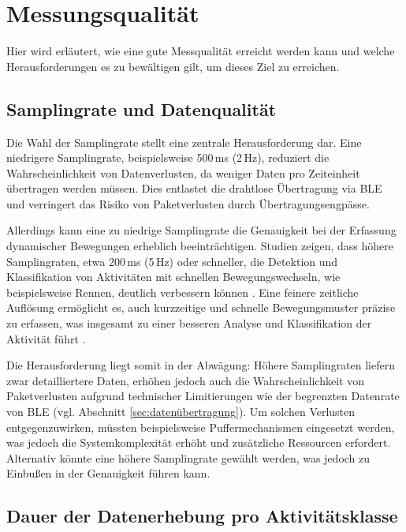 \section{Messungsqualität}
\label{sec:messungsqualität}

Hier wird erläutert, wie eine gute Messqualität erreicht werden kann und welche Herausforderungen es zu bewältigen gilt, um dieses Ziel zu erreichen.

\subsection{Samplingrate und Datenqualität}

Die Wahl der Samplingrate stellt eine zentrale Herausforderung dar. Eine niedrigere Samplingrate, beispielsweise 500\,ms (2\,Hz), reduziert die Wahrscheinlichkeit von Datenverlusten, da weniger Daten pro Zeiteinheit übertragen werden müssen. Dies entlastet die drahtlose Übertragung via BLE und verringert das Risiko von Paketverlusten durch Übertragungsengpässe.

Allerdings kann eine zu niedrige Samplingrate die Genauigkeit bei der Erfassung dynamischer Bewegungen erheblich beeinträchtigen. Studien zeigen, dass höhere Samplingraten, etwa 200 ms (5 Hz) oder schneller, die Detektion und Klassifikation von Aktivitäten mit schnellen Bewegungswechseln, wie beispielsweise Rennen, deutlich verbessern können \cite{turn0search0}. Eine feinere zeitliche Auflösung ermöglicht es, auch kurzzeitige und schnelle Bewegungsmuster präzise zu erfassen, was insgesamt zu einer besseren Analyse und Klassifikation der Aktivität führt \cite{niazi2017statistical}.

Die Herausforderung liegt somit in der Abwägung: Höhere Samplingraten liefern zwar detailliertere Daten, erhöhen jedoch auch die Wahrscheinlichkeit von Paketverlusten aufgrund technischer Limitierungen wie der begrenzten Datenrate von BLE (vgl. Abschnitt \ref{sec:datenübertragung}). Um solchen Verlusten entgegenzuwirken, müssten beispielsweise Puffermechanismen eingesetzt werden, was jedoch die Systemkomplexität erhöht und zusätzliche Ressourcen erfordert. Alternativ könnte eine höhere Samplingrate gewählt werden, was jedoch zu Einbußen in der Genauigkeit führen kann.

\subsection{Dauer der Datenerhebung pro Aktivitätsklasse}

